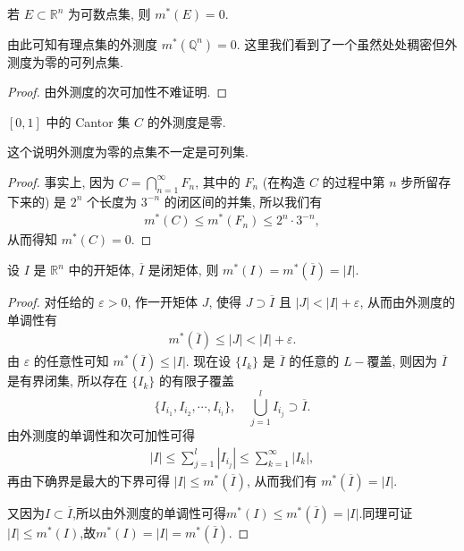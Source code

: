 \documentclass[../../main.tex]{subfiles}
\begin{document}
\begin{corollary}
若 \(E \subset \mathbb{R}^n\) 为可数点集, 则 \(m^*(E) = 0\).
\end{corollary}
\begin{remark}
由此可知有理点集的外测度 \(m^*(\mathbb{Q}^n)=0\). 这里我们看到了一个虽然处处稠密但外测度为零的可列点集.
\end{remark}
\begin{proof}
由外测度的次可加性不难证明.
\end{proof}

\begin{proposition}\label{proposition:Cantor集的外测度是零}
\([0,1]\) 中的 Cantor 集 \(C\) 的外测度是零.
\end{proposition}
\begin{remark}
这个说明外测度为零的点集不一定是可列集.
\end{remark}
\begin{proof}
事实上, 因为 \(C = \bigcap_{n = 1}^{\infty} F_n\), 其中的 \(F_n\) (在构造 \(C\) 的过程中第 \(n\) 步所留存下来的) 是 \(2^n\) 个长度为 \(3^{-n}\) 的闭区间的并集, 所以我们有
\begin{align*}
m^*(C) \leq m^*(F_n) \leq 2^n \cdot 3^{-n},
\end{align*}
从而得知 \(m^*(C)=0\). 
\end{proof}

\begin{proposition}
设 \(I\) 是 \(\mathbb{R}^n\) 中的开矩体, \(\overline{I}\) 是闭矩体, 则 \(m^*(I) = m^*(\overline{I}) = |I|\). 
\end{proposition}
\begin{proof}
对任给的 \(\varepsilon > 0\), 作一开矩体 \(J\), 使得 \(J \supset \overline{I}\) 且 \(|J| < |I| + \varepsilon\), 从而由外测度的单调性有
\begin{align*}
m^*(\overline{I}) \leq |J| < |I| + \varepsilon.
\end{align*}
由 \(\varepsilon\) 的任意性可知 \(m^*(\overline{I}) \leq |I|\). 现在设 \(\{I_k\}\) 是 \(\overline{I}\) 的任意的 \(L -\)覆盖, 则因为 \(\overline{I}\) 是有界闭集, 所以存在 \(\{I_k\}\) 的有限子覆盖
\[
\{I_{i_1}, I_{i_2}, \cdots, I_{i_l}\}, \quad \bigcup_{j = 1}^l I_{i_j} \supset \overline{I}.
\]
由外测度的单调性和次可加性可得
\begin{align*}
|I| \leq \sum_{j = 1}^l |I_{i_j}| \leq \sum_{k = 1}^{\infty} |I_k|,
\end{align*}
再由下确界是最大的下界可得 \(|I| \leq m^*(\overline{I})\), 从而我们有 \(m^*(\overline{I}) = |I|\). 

又因为$I\subset \overline{I}$,所以由外测度的单调性可得$m^*(I)\leq m^*(\overline{I})=|I|$.同理可证\(|I| \leq m^*(I)\),故$m^*(I)=|I|=m^*(\overline{I})$.
\end{proof}
\end{document}
